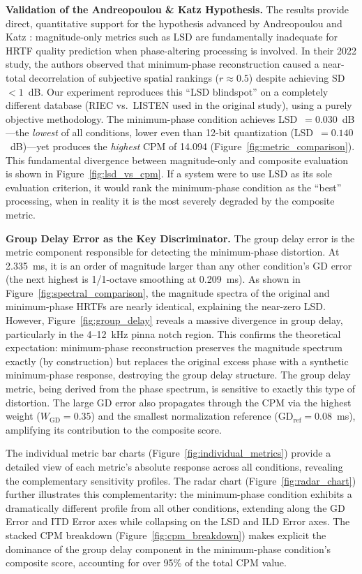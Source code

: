 \documentclass[12pt,a4paper]{article}
\begin{document}
\textbf{Validation of the Andreopoulou \& Katz Hypothesis.}
The results provide direct, quantitative support for the hypothesis advanced by Andreopoulou and Katz \cite{andreopoulou2022}: magnitude-only metrics such as LSD are fundamentally inadequate for HRTF quality prediction when phase-altering processing is involved. In their 2022 study, the authors observed that minimum-phase reconstruction caused a near-total decorrelation of subjective spatial rankings ($r \approx 0.5$) despite achieving SD $< 1$~dB. Our experiment reproduces this ``LSD blindspot'' on a completely different database (RIEC vs.\ LISTEN used in the original study), using a purely objective methodology. The minimum-phase condition achieves LSD~$= 0.030$~dB---the \textit{lowest} of all conditions, lower even than 12-bit quantization (LSD~$= 0.140$~dB)---yet produces the \textit{highest} CPM of 14.094 (Figure~\ref{fig:metric_comparison}). This fundamental divergence between magnitude-only and composite evaluation is shown in Figure~\ref{fig:lsd_vs_cpm}. If a system were to use LSD as its sole evaluation criterion, it would rank the minimum-phase condition as the ``best'' processing, when in reality it is the most severely degraded by the composite metric.

\textbf{Group Delay Error as the Key Discriminator.}
The group delay error is the metric component responsible for detecting the minimum-phase distortion. At 2.335~ms, it is an order of magnitude larger than any other condition's GD error (the next highest is 1/1-octave smoothing at 0.209~ms). As shown in Figure~\ref{fig:spectral_comparison}, the magnitude spectra of the original and minimum-phase HRTFs are nearly identical, explaining the near-zero LSD. However, Figure~\ref{fig:group_delay} reveals a massive divergence in group delay, particularly in the 4--12~kHz pinna notch region. This confirms the theoretical expectation: minimum-phase reconstruction preserves the magnitude spectrum exactly (by construction) but replaces the original excess phase with a synthetic minimum-phase response, destroying the group delay structure. The group delay metric, being derived from the phase spectrum, is sensitive to exactly this type of distortion. The large GD error also propagates through the CPM via the highest weight ($W_{\mathrm{GD}} = 0.35$) and the smallest normalization reference ($\mathrm{GD}_{\mathrm{ref}} = 0.08$~ms), amplifying its contribution to the composite score.

The individual metric bar charts (Figure~\ref{fig:individual_metrics}) provide a detailed view of each metric's absolute response across all conditions, revealing the complementary sensitivity profiles. The radar chart (Figure~\ref{fig:radar_chart}) further illustrates this complementarity: the minimum-phase condition exhibits a dramatically different profile from all other conditions, extending along the GD Error and ITD Error axes while collapsing on the LSD and ILD Error axes. The stacked CPM breakdown (Figure~\ref{fig:cpm_breakdown}) makes explicit the dominance of the group delay component in the minimum-phase condition's composite score, accounting for over 95\% of the total CPM value.
\end{document}
